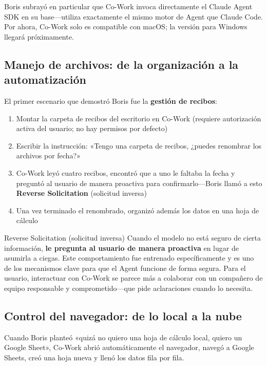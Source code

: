 \documentclass[a4paper]{article}
\begin{document}
Boris subrayó en particular que Co-Work invoca directamente el Claude Agent SDK en su base—utiliza exactamente el mismo motor de Agent que Claude Code. Por ahora, Co-Work solo es compatible con macOS; la versión para Windows llegará próximamente.

\subsection{Manejo de archivos: de la organización a la automatización}

El primer escenario que demostró Boris fue la \textbf{gestión de recibos}:

\begin{enumerate}
    \item Montar la carpeta de recibos del escritorio en Co-Work (requiere autorización activa del usuario; no hay permisos por defecto)
    \item Escribir la instrucción: «Tengo una carpeta de recibos, ¿puedes renombrar los archivos por fecha?»
    \item Co-Work leyó cuatro recibos, encontró que a uno le faltaba la fecha y preguntó al usuario de manera proactiva para confirmarlo—Boris llamó a esto \textbf{Reverse Solicitation} (solicitud inversa)
    \item Una vez terminado el renombrado, organizó además los datos en una hoja de cálculo
\end{enumerate}

\begin{importantbox}{Reverse Solicitation (solicitud inversa)}
Cuando el modelo no está seguro de cierta información, \textbf{le pregunta al usuario de manera proactiva} en lugar de asumirla a ciegas. Este comportamiento fue entrenado específicamente y es uno de los mecanismos clave para que el Agent funcione de forma segura. Para el usuario, interactuar con Co-Work se parece más a colaborar con un compañero de equipo responsable y comprometido—que pide aclaraciones cuando lo necesita.
\end{importantbox}

\subsection{Control del navegador: de lo local a la nube}

Cuando Boris planteó «quizá no quiero una hoja de cálculo local, quiero un Google Sheet», Co-Work abrió automáticamente el navegador, navegó a Google Sheets, creó una hoja nueva y llenó los datos fila por fila.
\end{document}

